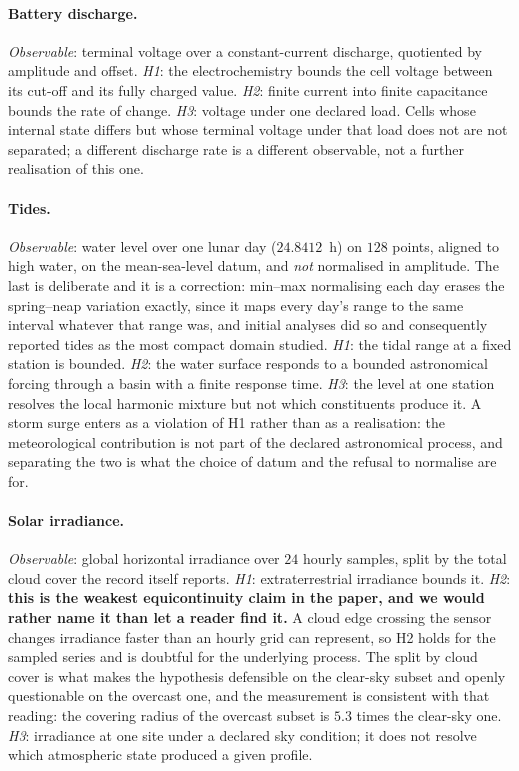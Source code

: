 \documentclass[10pt]{article}
\theoremstyle{plain}
\theoremstyle{definition}
\theoremstyle{remark}
\begin{document}
\paragraph{Battery discharge.}
\emph{Observable}: terminal voltage over a constant-current discharge,
quotiented by amplitude and offset. \emph{H1}: the electrochemistry bounds the
cell voltage between its cut-off and its fully charged value. \emph{H2}: finite
current into finite capacitance bounds the rate of change. \emph{H3}: voltage
under one declared load. Cells whose internal state differs but whose terminal
voltage under that load does not are not separated; a different discharge rate
is a different observable, not a further realisation of this one.

\paragraph{Tides.}
\emph{Observable}: water level over one lunar day ($24.8412$~h) on $128$ points,
aligned to high water, on the mean-sea-level datum, and \emph{not} normalised in
amplitude. The last is deliberate and it is a correction: min--max normalising
each day erases the spring--neap variation exactly, since it maps every day's
range to the same interval whatever that range was, and initial analyses did so and consequently reported tides as the most compact domain
studied. \emph{H1}: the
tidal range at a fixed station is bounded. \emph{H2}: the water surface responds
to a bounded astronomical forcing through a basin with a finite response time.
\emph{H3}: the level at one station resolves the local harmonic mixture but not
which constituents produce it. A storm surge enters as a violation of H1 rather
than as a realisation: the meteorological contribution is not part of the
declared astronomical process, and separating the two is what the choice of
datum and the refusal to normalise are for.

\paragraph{Solar irradiance.}
\emph{Observable}: global horizontal irradiance over $24$ hourly samples, split
by the total cloud cover the record itself reports. \emph{H1}: extraterrestrial
irradiance bounds it. \emph{H2}: \textbf{this is the weakest equicontinuity
claim in the paper, and we would rather name it than let a reader find it.} A
cloud edge crossing the sensor changes irradiance faster than an hourly grid can
represent, so H2 holds for the sampled series and is doubtful for the underlying
process. The split by cloud cover is what makes the hypothesis defensible on the
clear-sky subset and openly questionable on the overcast one, and the
measurement is consistent with that reading: the covering radius of the overcast
subset is $5.3$ times the clear-sky one. \emph{H3}: irradiance at one site under
a declared sky condition; it does not resolve which atmospheric state produced a
given profile.
\end{document}
